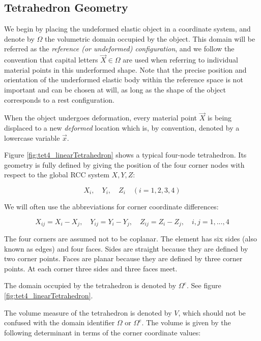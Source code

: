 \subsection{Tetrahedron Geometry}
We begin by placing the undeformed elastic object in a coordinate system, and denote by $ \Omega $ the volumetric domain occupied by the object. This domain will be referred as the \textit{reference (or undeformed) configuration}, and we follow the convention that capital letters $ \vec{X} \in \Omega $ are used when referring to individual material points in this underformed shape. Note that the precise position and orientation of the underformed elastic body within the reference space is not important and can be chosen at will, as long as the shape of the object corresponds to a rest configuration.

When the object undergoes deformation, every material point $ \vec{X} $ is being displaced to a new \textit{deformed} location which is, by convention, denoted by a lowercase variable $ \vec{x} $. 

Figure \ref{fig:tet4_linearTetrahedron} shows a typical four-node tetrahedron. Its geometry is fully defined by giving the position of the four corner nodes with respect to the global RCC system $ {X,Y,Z} $:

\begin{equation}
X_i, \quad Y_i, \quad Z_i \quad (i=1,2,3,4)
\end{equation}

We will often use the abbreviations for corner coordinate differences:

\begin{equation}
X_{ij}=X_i-X_j, \quad Y_{ij}=Y_i-Y_j, \quad Z_{ij}=Z_i-Z_j, \quad i,j=1,...,4
\end{equation}

The four corners are assumed not to be coplanar. The element has six sides (also known as edges) and four faces. Sides are straight because they are defined by two corner points. Faces are planar because they are defined by three corner points. At each corner three sides and three faces meet.

The domain occupied by the tetrahedron is denoted by $ \Omega^e $. See figure \ref{fig:tet4_linearTetrahedron}.

The volume measure of the tetrahedron is denoted by $ V $, which should not be confused with the domain identifier $ \Omega $ or $ \Omega^e $. The volume is given by the following determinant in terms of the corner coordinate values:


